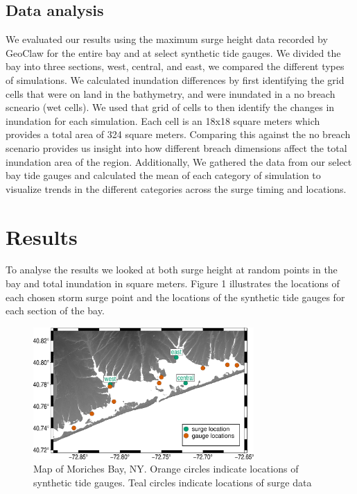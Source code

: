 \documentclass{coastal_paper}
\begin{document}
\subsection{Data analysis}
We evaluated our results using the maximum surge height data recorded by GeoClaw for the entire bay and at select synthetic tide gauges. We divided the bay into three sections, west, central, and east, we compared the different types of simulations. We calculated inundation differences by first identifying the grid cells that were on land in the bathymetry, and were inundated in a no breach scneario (wet cells). We used that grid of cells to then identify the changes in inundation for each simulation. Each cell is an 18x18 square meters which provides a total area of 324 square meters. Comparing this against the no breach scenario provides us insight into how different breach dimensions affect the total inundation area of the region. Additionally, We gathered the data from our select bay tide gauges and calculated the mean of each category of simulation to visualize trends in the different categories across the surge timing and locations. 

\section{Results}
To analyse the results we looked at both surge height at random points in the bay and total inundation in square meters. Figure 1 illustrates the locations of each chosen storm surge point and the locations of the synthetic tide gauges for each section of the bay.
\begin{figure}
    \centering
    \includegraphics[width=0.75\textwidth]{dot_map.pdf}
    \caption{Map of Moriches Bay, NY. Orange circles indicate locations of synthetic tide gauges. Teal circles indicate locations of surge data}
    \label{fig1}
\end{figure}
\end{document}
